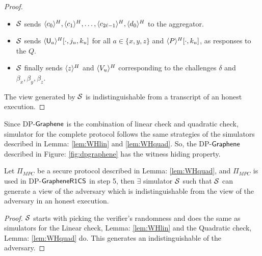 \begin{proof}
\begin{itemize}
		\item $\mathcal{S}$ sends $\langle{c_0}\rangle^H, \langle{c_1}\rangle^H, \ldots, \langle{c_{2\ell-1}}\rangle^H, \langle{d_0}\rangle^H$ to the aggregator.
		
		\item $\mathcal{S}$ sends $\langle{\mathsf{U}_a}\rangle^H[\cdot,j_u,k_u]$ for all $a\in\{x,y,z\}$ and $\langle{P}\rangle^H[\cdot,k_u]$, as responses to the $Q$.
		
		\item $\mathcal{S}$ finally sends $\langle{z}\rangle^H$ and $\langle{V_u}\rangle^H$ corresponding to the challenges $\delta$ and $\beta_x, \beta_y, \beta_z$.
	\end{itemize}
	The view generated by $\mathcal{S}$ is indistinguishable from a transcript of an honest execution. 
\end{proof}

Since DP-$\textsf{Graphene}$ is the combination of linear check and quadratic check, simulator for the complete protocol follows the same strategies of the simulators described in Lemma: \ref{lem:WHlin} and \ref{lem:WHquad}. So, the DP-$\textsf{Graphene}$ described in Figure: \ref{fig:dpgraphene} has the witness hiding property.

\begin{lemma}
	Let $\Pi_{MPC}$ be a secure protocol described in Lemma: \ref{lem:WHquad}, and $\Pi_{MPC}$ is used in DP-$\mathsf{GrapheneR1CS}$ in step 5, then $\exists$ simulator $\mathcal{S}$ such that $\mathcal{S}$ can generate a view of the adversary which is indistinguishable from the view of the adversary in an honest execution.
\end{lemma}

\begin{proof}
	$\mathcal{S}$ starts with picking the verifier's randomness and does the same as simulators for the Linear check, Lemma: \ref{lem:WHlin} and the Quadratic check, Lemma: \ref{lem:WHquad} do. This generates an indistinguishable of the adversary.
\end{proof}